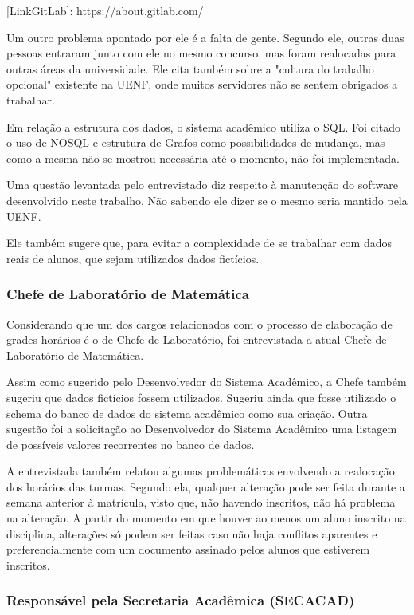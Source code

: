         [LinkGitLab]: https://about.gitlab.com/

        Um outro problema apontado por ele é a falta de gente. Segundo ele, outras duas pessoas entraram junto com ele no mesmo concurso, mas foram realocadas para outras áreas da universidade. Ele cita também sobre a "cultura do trabalho opcional" existente na UENF, onde muitos servidores não se sentem obrigados a trabalhar.

        Em relação a estrutura dos dados, o sistema acadêmico utiliza o SQL. Foi citado o uso de NOSQL e estrutura de Grafos como possibilidades de mudança, mas como a mesma não se mostrou necessária até o momento, não foi implementada.

        Uma questão levantada pelo entrevistado diz respeito à manutenção do software desenvolvido neste trabalho. Não sabendo ele dizer se o mesmo seria mantido pela UENF.

        Ele também sugere que, para evitar a complexidade de se trabalhar com dados reais de alunos, que sejam utilizados dados fictícios.

    \subsubsection{Chefe de Laboratório de Matemática} %

        Considerando que um dos cargos relacionados com o processo de elaboração de grades horários é o de Chefe de Laboratório, foi entrevistada a atual Chefe de Laboratório de Matemática.

        Assim como sugerido pelo Desenvolvedor do Sistema Acadêmico, a Chefe também sugeriu que dados fictícios fossem utilizados. Sugeriu ainda que fosse utilizado o schema do banco de dados do sistema acadêmico como sua criação. Outra sugestão foi a solicitação ao Desenvolvedor do Sistema Acadêmico uma listagem de possíveis valores recorrentes no banco de dados.

        A entrevistada também relatou algumas problemáticas envolvendo a realocação dos horários das turmas. Segundo ela, qualquer alteração pode ser feita durante a semana anterior à matrícula, visto que, não havendo inscritos, não há problema na alteração. A partir do momento em que houver ao menos um aluno inscrito na disciplina, alterações só podem ser feitas caso não haja conflitos aparentes e preferencialmente com um documento assinado pelos alunos que estiverem inscritos.

    \subsubsection{Responsável pela Secretaria Acadêmica (SECACAD)} %

